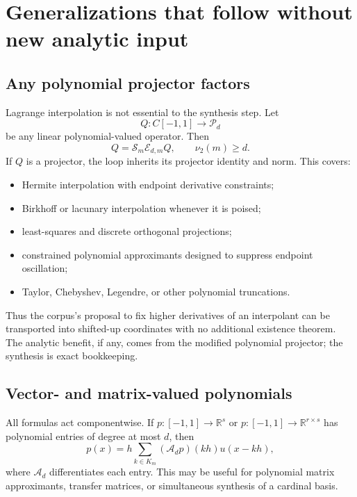 \documentclass[11pt,oneside]{book}
\theoremstyle{definition}
\theoremstyle{remark}
\newcommand{\R}{\mathbb R}
\newcommand{\Pp}{\mathcal P}
\newcommand{\Aop}{\mathcal A}
\newcommand{\Sop}{\mathcal S}
\newcommand{\Eop}{\mathcal E}
\newcommand{\vtwo}{\nu_2}
\begin{document}
\chapter{Generalizations that follow without new analytic input}
\label{ch:generalizations}

\section{Any polynomial projector factors}
Lagrange interpolation is not essential to the synthesis step.  Let
\begin{equation}
 Q:C[-1,1]\longrightarrow\Pp_d
 \label{eq:any-projector}
\end{equation}
be any linear polynomial-valued operator.  Then
\begin{equation}
 Q=\Sop_m\Eop_{d,m}Q,
 \qquad \vtwo(m)\ge d.
 \label{eq:any-projector-factorization}
\end{equation}
If \(Q\) is a projector, the loop inherits its projector identity and norm.  This covers:
\begin{itemize}
\item Hermite interpolation with endpoint derivative constraints;
\item Birkhoff or lacunary interpolation whenever it is poised;
\item least-squares and discrete orthogonal projections;
\item constrained polynomial approximants designed to suppress endpoint oscillation;
\item Taylor, Chebyshev, Legendre, or other polynomial truncations.
\end{itemize}
Thus the corpus's proposal to fix higher derivatives of an interpolant can be transported into shifted-up coordinates with no additional existence theorem.  The analytic benefit, if any, comes from the modified polynomial projector; the synthesis is exact bookkeeping.

\section{Vector- and matrix-valued polynomials}
All formulas act componentwise.  If \(p:[-1,1]\to\R^s\) or \(p:[-1,1]\to\R^{r\times s}\) has polynomial entries of degree at most \(d\), then
\begin{equation}
 p(x)=h\sum_{k\in K_m}(\Aop_dp)(kh)u(x-kh),
 \label{eq:matrix-polynomial-synthesis}
\end{equation}
where \(\Aop_d\) differentiates each entry.  This may be useful for polynomial matrix approximants, transfer matrices, or simultaneous synthesis of a cardinal basis.
\end{document}
